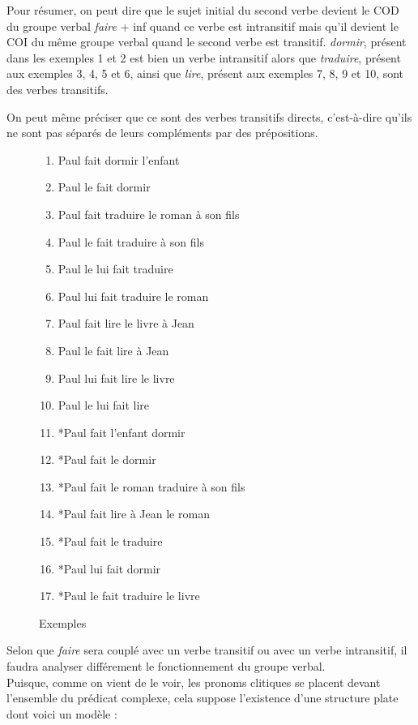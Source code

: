 Pour résumer, on peut dire que le sujet initial du second verbe devient le COD du groupe verbal \emph{faire} + inf quand ce verbe est intransitif mais qu'il devient le COI du même groupe verbal quand le second verbe est transitif.
\emph{dormir}, présent dans les exemples 1 et 2 est bien un verbe intransitif alors que \emph{traduire}, présent aux exemples 3, 4, 5 et 6, ainsi que \emph{lire}, présent aux exemples 7, 8, 9 et 10, sont des verbes transitifs.

On peut même préciser que ce sont des verbes transitifs directs, c'est-à-dire qu'ils ne sont pas séparés de leurs compléments par des prépositions.\\

\begin{figure}[ht]
\label{phenomene.exemples}
\begin{enumerate}
  \item Paul fait dormir l'enfant
  \item Paul le fait dormir
  \item Paul fait traduire le roman à son fils
  \item Paul le fait traduire à son fils
  \item Paul le lui fait traduire
  \item Paul lui fait traduire le roman
  \item Paul fait lire le livre à Jean
  \item Paul le fait lire à Jean
  \item Paul lui fait lire le livre
  \item Paul le lui fait lire
  \item *Paul fait l'enfant dormir
  \item *Paul fait le dormir
  \item *Paul fait le roman traduire à son fils
  \item *Paul fait lire à Jean le roman
  \item *Paul fait le traduire
  \item *Paul lui fait dormir
  \item *Paul le fait traduire le livre
\end{enumerate}
\caption{Exemples}
\end{figure}

Selon que \emph{faire} sera couplé avec un verbe transitif ou avec un verbe intransitif, il faudra analyser différement le fonctionnement du groupe verbal.\\

Puisque, comme on vient de le voir, les pronoms clitiques se placent devant l'ensemble du prédicat complexe, cela suppose l'existence d'une structure plate dont voici un modèle : \\

